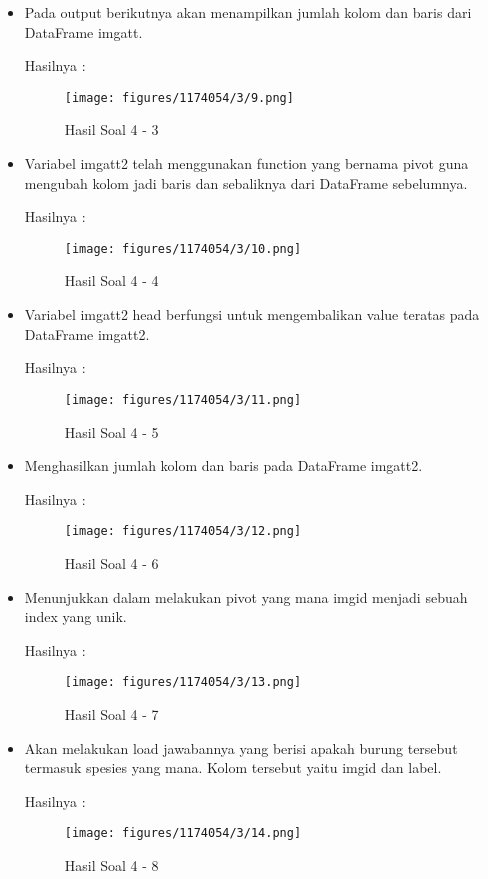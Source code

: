 \begin{enumerate}
\begin{itemize}
\item Pada output berikutnya akan menampilkan jumlah kolom dan baris dari DataFrame imgatt. 

Hasilnya :
\begin{figure}[H]
	\centering
		\texttt{[image: figures/1174054/3/9.png]}
		\caption{Hasil Soal 4 - 3}
\end{figure}
		
\item Variabel imgatt2 telah menggunakan function yang bernama pivot guna mengubah kolom jadi baris dan sebaliknya dari DataFrame sebelumnya.

Hasilnya :
\begin{figure}[H]
	\centering
		\texttt{[image: figures/1174054/3/10.png]}
		\caption{Hasil Soal 4 - 4}
\end{figure}
		
\item Variabel imgatt2 head berfungsi untuk mengembalikan value teratas pada DataFrame imgatt2.

Hasilnya :
\begin{figure}[H]
	\centering
		\texttt{[image: figures/1174054/3/11.png]}
		\caption{Hasil Soal 4 - 5}
\end{figure}
		
\item Menghasilkan jumlah kolom dan baris pada DataFrame imgatt2.

Hasilnya :
\begin{figure}[H]
	\centering
		\texttt{[image: figures/1174054/3/12.png]}
		\caption{Hasil Soal 4 - 6}
\end{figure}
		
\item Menunjukkan dalam melakukan pivot yang mana imgid menjadi sebuah index yang unik.

Hasilnya :
\begin{figure}[H]
	\centering
		\texttt{[image: figures/1174054/3/13.png]}
		\caption{Hasil Soal 4 - 7}
\end{figure}
		
\item Akan melakukan load jawabannya yang berisi apakah burung tersebut termasuk spesies yang mana. Kolom tersebut yaitu imgid dan label.

Hasilnya :
\begin{figure}[H]
	\centering
		\texttt{[image: figures/1174054/3/14.png]}
		\caption{Hasil Soal 4 - 8}
\end{figure}
		

\end{itemize}
\end{enumerate}
